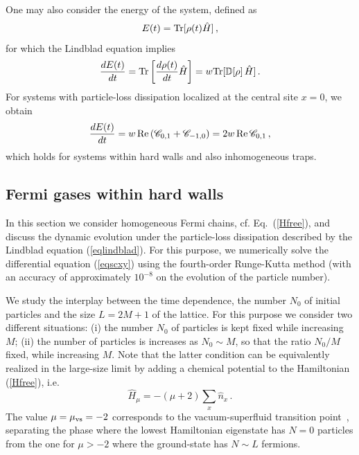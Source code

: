  One may also consider the energy of the system, defined as
  \begin{eqnarray}
  E(t) = {\rm Tr}[\rho(t) \hat H] \,,
  \label{enedef}
  \end{eqnarray}
  for which the Lindblad equation implies
  \begin{eqnarray}
    {d E(t)\over dt} = {\rm Tr}\left[{d\rho(t)\over dt} \hat H\right]= w
    {\rm Tr}[{\mathbb D}[\rho] \,\hat H]\,.
    \label{detg}
  \end{eqnarray}
  For systems with particle-loss dissipation localized at the central
  site $x=0$, we obtain
  \begin{eqnarray}
    {d E(t)\over dt} =
    w \, {\rm Re}\,({\mathscr C}_{0,1}+{\mathscr C}_{-1,0}) =
    2 w \, {\rm Re}\,{\mathscr C}_{0,1}\,,
    \label{derene}
  \end{eqnarray}
  which holds for systems within hard walls and also inhomogeneous
  traps.
  
  \subsection{Fermi gases within hard walls}
  \label{hwbc}
  
  In this section we consider homogeneous Fermi chains, cf.
  Eq.~(\ref{Hfree}), and discuss the dynamic evolution under the
  particle-loss dissipation described by the Lindblad equation
  (\ref{eqlindblad}).  For this
  purpose, we numerically solve the differential equation (\ref{eqscxy})
  using the fourth-order Runge-Kutta method (with an accuracy of
  approximately $10^{-8}$ on the evolution of the particle number).
  
  We study the interplay between the time dependence, the number $N_0$
  of initial particles and the size $L=2M+1$ of the lattice.  For this
  purpose we consider two different situations: (i) the number $N_0$ of
  particles is kept fixed while increasing $M$; (ii) the number of
  particles is increases as $N_0\sim M$, so that the ratio $N_0/M$
  fixed, while increasing $M$. Note that the latter condition can be
  equivalently realized in the large-size limit by adding a chemical
  potential to the Hamiltonian (\ref{Hfree}), i.e.
  \begin{equation}
  \hat H_\mu = -(\mu+2) \sum _x \hat n_x \,.
  \label{chemicalpot}
  \end{equation}
  The value $\mu=\mu_{\rm vs}=-2$ corresponds to the vacuum-superfluid
  transition point~\cite{S99,ACV-14}, separating the phase
  where the lowest Hamiltonian eigenstate has $N=0$ particles from the
  one for $\mu>-2$ where the ground-state has $N\sim L$ fermions.
  
